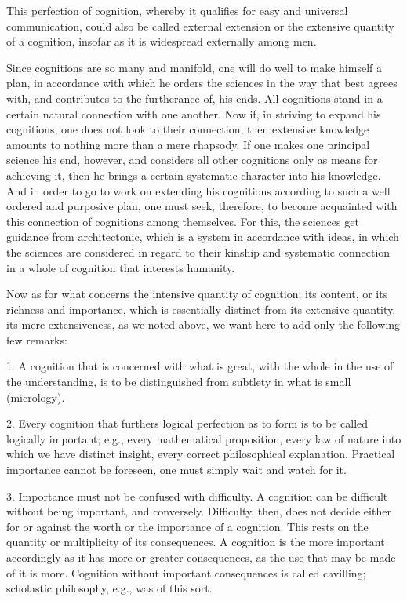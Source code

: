 This perfection of cognition,
whereby it qualifies for
easy and universal communication,
could also be called external extension
or the extensive quantity of a cognition,
insofar as it is widespread externally among men.

Since cognitions are so many and manifold,
one will do well to make himself a plan,
in accordance with which he orders the sciences
in the way that best agrees with,
and contributes to the furtherance of, his ends.
All cognitions stand in a certain
natural connection with one another.
Now if, in striving to expand his cognitions,
one does not look to their connection,
then extensive knowledge amounts to
nothing more than a mere rhapsody.
If one makes one principal science his end, however,
and considers all other cognitions only
as means for achieving it,
then he brings a certain systematic character into his knowledge.
And in order to go to work on extending his cognitions
according to such a well ordered and purposive plan,
one must seek, therefore, to become acquainted with
this connection of cognitions among themselves.
For this, the sciences get guidance from architectonic,
which is a system in accordance with ideas,
in which the sciences are considered
in regard to their kinship
and systematic connection in
a whole of cognition that interests humanity.

Now as for what concerns the intensive quantity of cognition;
its content, or its richness and importance,
which is essentially distinct from its extensive quantity,
its mere extensiveness, as we noted above,
we want here to add only the following few remarks:

1. A cognition that is concerned with what is great,
with the whole in the use of the understanding,
is to be distinguished from subtlety in what is small (micrology).

2. Every cognition that furthers logical perfection
as to form is to be called logically important;
e.g., every mathematical proposition,
every law of nature into which we have distinct insight,
every correct philosophical explanation.
Practical importance cannot be foreseen,
one must simply wait and watch for it.

3. Importance must not be confused with difficulty.
A cognition can be difficult without being important, and conversely.
Difficulty, then, does not decide either for or against
the worth or the importance of a cognition.
This rests on the quantity or multiplicity of its consequences.
A cognition is the more important accordingly as
it has more or greater consequences,
as the use that may be made of it is more.
Cognition without important consequences is called cavilling;
scholastic philosophy, e.g., was of this sort.

